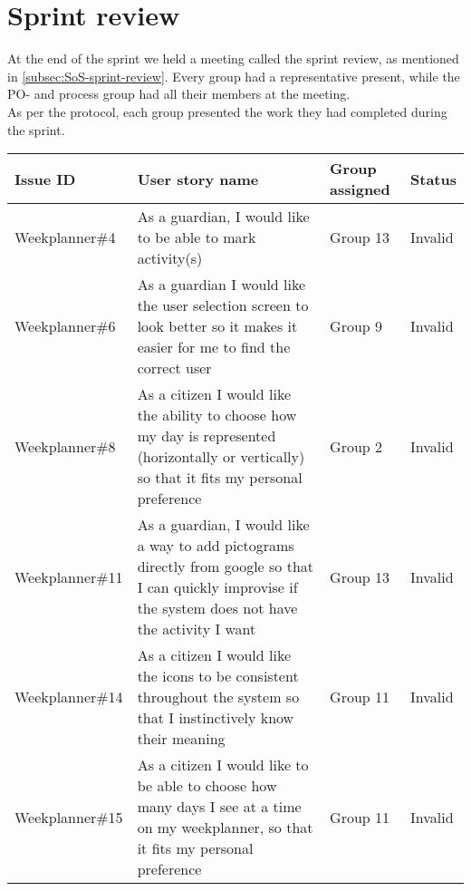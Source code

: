 \section{Sprint review}
At the end of the sprint we held a meeting called the sprint review, as mentioned in \autoref{subsec:SoS-sprint-review}.
Every group had a representative present, while the PO- and process group had all their members at the meeting.
\\
As per the protocol, each group presented the work they had completed during the sprint.

\begin{table}[!ht]
    \begin{tabular}{|p{2.8cm}|p{7cm}|p{2cm}|p{1.5cm}|}
    \hline
    Issue ID        & User story name                                                                                                                                                          & Group assigned  & Status     \\ \hline
    Weekplanner\#4  & As a guardian, I would like to be able to mark activity(s)                                                                                                               & Group 13        & Invalid    \\ \hline
    Weekplanner\#6  & As a guardian I would like the user selection screen to look better so it makes it easier for me to find the correct user                                                & Group 9         & Invalid    \\ \hline
    Weekplanner\#8  & As a citizen I would like the ability to choose how my day is represented (horizontally or vertically) so that it fits my personal preference                            & Group 2         & Invalid    \\ \hline
    Weekplanner\#11 & As a guardian, I would like a way to add pictograms directly from google so that I can quickly improvise if the system does not have the activity I want                 & Group 13        & Invalid    \\ \hline
    Weekplanner\#14 & As a citizen I would like the icons to be consistent throughout the system so that I instinctively know their meaning                                                    & Group 11        & Invalid    \\ \hline
    Weekplanner\#15 & As a citizen I would like to be able to choose how many days I see at a time on my weekplanner, so that it fits my personal preference                                   & Group 11        & Invalid    \\ \hline

\end{tabular}
\end{table}
